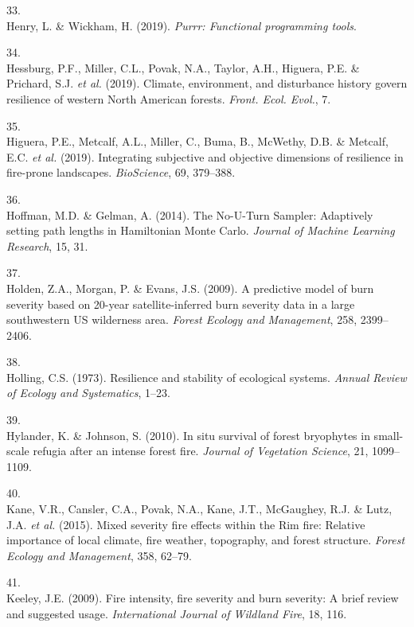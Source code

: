 \documentclass[]{article}
\begin{document}
\leavevmode\hypertarget{ref-henry2019}{}%
33.\\
Henry, L. \& Wickham, H. (2019). \emph{Purrr: Functional programming
tools}.

\leavevmode\hypertarget{ref-hessburg2019}{}%
34.\\
Hessburg, P.F., Miller, C.L., Povak, N.A., Taylor, A.H., Higuera, P.E.
\& Prichard, S.J. \emph{et al.} (2019). Climate, environment, and
disturbance history govern resilience of western North American forests.
\emph{Front. Ecol. Evol.}, 7.

\leavevmode\hypertarget{ref-higuera2019}{}%
35.\\
Higuera, P.E., Metcalf, A.L., Miller, C., Buma, B., McWethy, D.B. \&
Metcalf, E.C. \emph{et al.} (2019). Integrating subjective and objective
dimensions of resilience in fire-prone landscapes. \emph{BioScience},
69, 379--388.

\leavevmode\hypertarget{ref-hoffman2014}{}%
36.\\
Hoffman, M.D. \& Gelman, A. (2014). The No-U-Turn Sampler: Adaptively
setting path lengths in Hamiltonian Monte Carlo. \emph{Journal of
Machine Learning Research}, 15, 31.

\leavevmode\hypertarget{ref-holden2009}{}%
37.\\
Holden, Z.A., Morgan, P. \& Evans, J.S. (2009). A predictive model of
burn severity based on 20-year satellite-inferred burn severity data in
a large southwestern US wilderness area. \emph{Forest Ecology and
Management}, 258, 2399--2406.

\leavevmode\hypertarget{ref-holling1973}{}%
38.\\
Holling, C.S. (1973). Resilience and stability of ecological systems.
\emph{Annual Review of Ecology and Systematics}, 1--23.

\leavevmode\hypertarget{ref-hylander2010}{}%
39.\\
Hylander, K. \& Johnson, S. (2010). In situ survival of forest
bryophytes in small-scale refugia after an intense forest fire.
\emph{Journal of Vegetation Science}, 21, 1099--1109.

\leavevmode\hypertarget{ref-kane2015}{}%
40.\\
Kane, V.R., Cansler, C.A., Povak, N.A., Kane, J.T., McGaughey, R.J. \&
Lutz, J.A. \emph{et al.} (2015). Mixed severity fire effects within the
Rim fire: Relative importance of local climate, fire weather,
topography, and forest structure. \emph{Forest Ecology and Management},
358, 62--79.

\leavevmode\hypertarget{ref-keeley2009}{}%
41.\\
Keeley, J.E. (2009). Fire intensity, fire severity and burn severity: A
brief review and suggested usage. \emph{International Journal of
Wildland Fire}, 18, 116.
\end{document}

